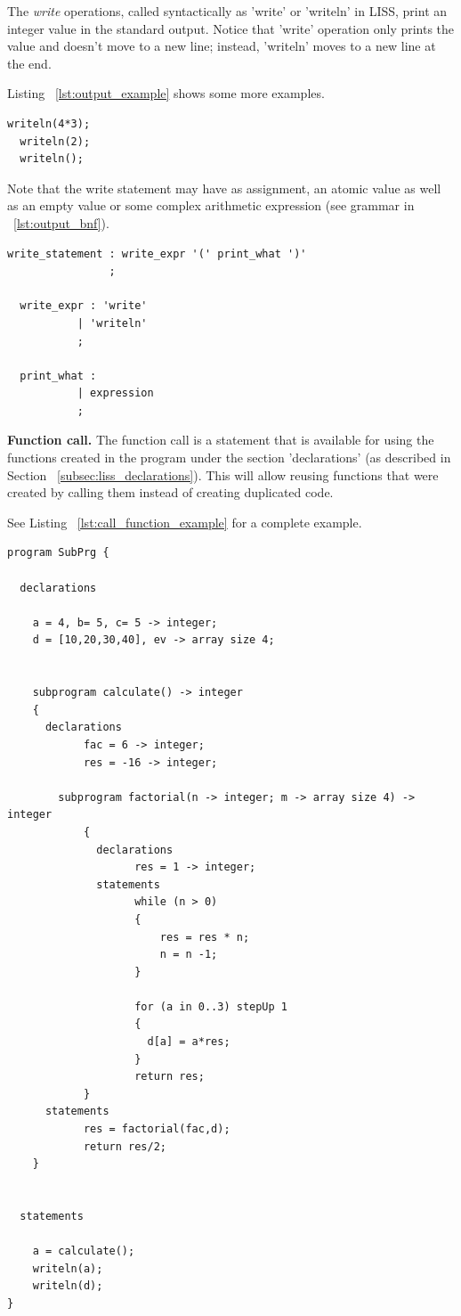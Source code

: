\documentclass[
  oneside,
  11pt, a4paper,
  footinclude=true,
  headinclude=true,
  cleardoublepage=empty
]{scrbook}
\begin{document}
The \textit{write} operations, called syntactically as 'write' or 'writeln' in LISS, print an integer value in the standard output.
Notice that 'write' operation only prints the value and doesn't move to a new line; instead, 'writeln' moves to a new line at the end.

Listing ~\ref{lst:output_example} shows some more examples.

\begin{lstlisting}[caption={Example of output operations in LISS},label={lst:output_example}]
  writeln(4*3);
  writeln(2);
  writeln();
\end{lstlisting}

Note that the write statement may have as assignment, an atomic value as well as an empty value or some complex arithmetic expression (see grammar in ~\ref{lst:output_bnf}).

\begin{lstlisting}[caption={CFG for output operation in LISS},label={lst:output_bnf}]
  write_statement : write_expr '(' print_what ')'
                ;

  write_expr : 'write'
           | 'writeln'
           ;

  print_what :
           | expression
           ;
\end{lstlisting}

\textbf{Function call.} The function call is a statement that is available for using the functions created in the program under the section 'declarations' (as described in Section ~\ref{subsec:liss_declarations}).
This will allow reusing functions that were created by calling them instead of creating duplicated code.

See Listing ~\ref{lst:call_function_example} for a complete example.

\begin{lstlisting}[caption={Example of call function in LISS},label={lst:call_function_example}]
 program SubPrg {

  declarations

    a = 4, b= 5, c= 5 -> integer;
    d = [10,20,30,40], ev -> array size 4;


    subprogram calculate() -> integer
    {
      declarations
            fac = 6 -> integer;
            res = -16 -> integer;

        subprogram factorial(n -> integer; m -> array size 4) -> integer
            {
              declarations
                    res = 1 -> integer;
              statements
                    while (n > 0)
                    {
                        res = res * n;
                        n = n -1;
                    }

                    for (a in 0..3) stepUp 1
                    {
                      d[a] = a*res;
                    }
                    return res;
            }
      statements
            res = factorial(fac,d);
            return res/2;
    }


  statements

    a = calculate();
    writeln(a);
    writeln(d);
}
\end{lstlisting}
\end{document}
